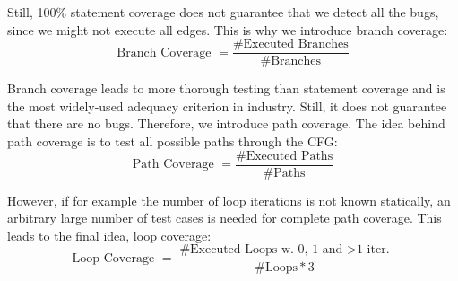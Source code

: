 Still, 100\% statement coverage does not guarantee that we detect all the bugs, since we might not execute all edges. This is why we introduce branch coverage:
$$\text{Branch Coverage } = \frac{\text{\#Executed Branches}}{\text{\#Branches}}$$

Branch coverage leads to more thorough testing than statement coverage and is the most widely-used adequacy criterion in industry. Still, it does not guarantee that there are no bugs. Therefore, we introduce path coverage. The idea behind path coverage is to test all possible paths through the CFG:
\vspace{-5pt}
$$\text{Path Coverage } = \frac{\text{\#Executed Paths}}{\text{\#Paths}}$$

However, if for example the number of loop iterations is not known statically, an arbitrary large number of test cases is needed for complete path coverage. This leads to the final idea, loop coverage:
$$\text{Loop Coverage } = \frac{\text{\#Executed Loops w. 0, 1 and $>$1 iter.}}{\text{\#Loops} * 3}$$
\vspace{-25pt}
